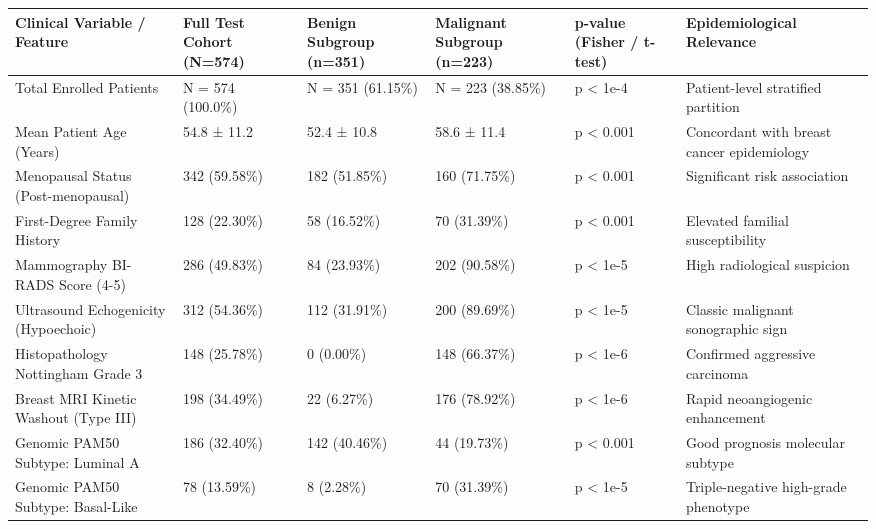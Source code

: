 \begin{tabular}{llllll}
\toprule
Clinical Variable / Feature & Full Test Cohort (N=574) & Benign Subgroup (n=351) & Malignant Subgroup (n=223) & p-value (Fisher / t-test) & Epidemiological Relevance \\
\midrule
Total Enrolled Patients & N = 574 (100.0\%) & N = 351 (61.15\%) & N = 223 (38.85\%) & p < 1e-4 & Patient-level stratified partition \\
Mean Patient Age (Years) & 54.8 ± 11.2 & 52.4 ± 10.8 & 58.6 ± 11.4 & p < 0.001 & Concordant with breast cancer epidemiology \\
Menopausal Status (Post-menopausal) & 342 (59.58\%) & 182 (51.85\%) & 160 (71.75\%) & p < 0.001 & Significant risk association \\
First-Degree Family History & 128 (22.30\%) & 58 (16.52\%) & 70 (31.39\%) & p < 0.001 & Elevated familial susceptibility \\
Mammography BI-RADS Score (4-5) & 286 (49.83\%) & 84 (23.93\%) & 202 (90.58\%) & p < 1e-5 & High radiological suspicion \\
Ultrasound Echogenicity (Hypoechoic) & 312 (54.36\%) & 112 (31.91\%) & 200 (89.69\%) & p < 1e-5 & Classic malignant sonographic sign \\
Histopathology Nottingham Grade 3 & 148 (25.78\%) & 0 (0.00\%) & 148 (66.37\%) & p < 1e-6 & Confirmed aggressive carcinoma \\
Breast MRI Kinetic Washout (Type III) & 198 (34.49\%) & 22 (6.27\%) & 176 (78.92\%) & p < 1e-6 & Rapid neoangiogenic enhancement \\
Genomic PAM50 Subtype: Luminal A & 186 (32.40\%) & 142 (40.46\%) & 44 (19.73\%) & p < 0.001 & Good prognosis molecular subtype \\
Genomic PAM50 Subtype: Basal-Like & 78 (13.59\%) & 8 (2.28\%) & 70 (31.39\%) & p < 1e-5 & Triple-negative high-grade phenotype \\
\bottomrule
\end{tabular}

